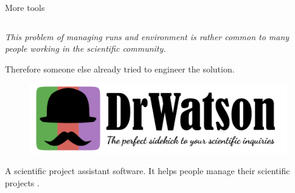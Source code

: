 \documentclass[9pt]{beamer}
\begin{document}
\begin{frame}{More tools}
    \begin{columns}
        \begin{column}{0.5\textwidth}
            \vspace*{10pt}
            \begin{center}
                \itshape
                This problem of managing runs and environment is rather common
                to many people working in the scientific community.
            \end{center}
            \vspace*{5pt}

            Therefore someone else already tried to engineer the solution.
            \vspace*{15pt}

            \begin{figure}
                \centering
                \href{https://juliadynamics.github.io/DrWatson.jl/dev/}{
                    \includegraphics[width=0.9\hsize]{drwatson}
                }
            \end{figure}
            \begin{center}
            \end{center}
            \begin{displayquote}
                A scientific project assistant software. It helps people manage
                their scientific projects \cite{Datseris2020}.
            \end{displayquote}


\end{column}
\end{columns}
\end{frame}
\end{document}
